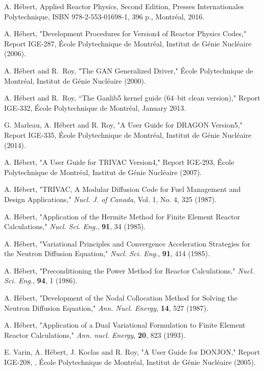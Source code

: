 \begin{thebibliography}{99}

A. H\'ebert, Applied Reactor Physics, Second Edition, Presses Internationales Polytechnique, ISBN 978-2-553-01698-1, 396 p., Montr\'eal, 2016.

A. H\'ebert, "Development Procedures for Version4 of
Reactor Physics Codes," Report IGE-287,
\'Ecole Polytechnique de Montr\'eal,
 Institut de G\'enie Nucl\'eaire (2006).

A. H\'ebert and R.~Roy, "The GAN Generalized Driver," 
\'Ecole Polytechnique de Montr\'eal,
 Institut de G\'enie Nucl\'eaire (2000).

A. H\'ebert and R.~Roy,
``The Ganlib5 kernel guide (64--bit clean version),"
Report IGE-332, \'Ecole Polytechnique de Montr\'eal, January 2013.

G. Marleau, A. H\'ebert and R. Roy,
"A User Guide for DRAGON Version5,"
Report IGE-335, \'Ecole Polytechnique de Montr\'eal,
Institut de G\'enie Nucl\'eaire (2014).

A. H\'ebert, "A User Guide for TRIVAC Version4,"
Report IGE-293, \'Ecole Polytechnique de Montr\'eal,
Institut de G\'enie Nucl\'eaire (2007).

A. H\'ebert, "TRIVAC, A Modular Diffusion Code for Fuel Management and 
Design Applications," {\sl Nucl. J. of Canada}, Vol. 1, No. 4, 325 (1987).

A. H\'ebert, "Application of the Hermite Method for Finite Element 
Reactor Calculations," {\sl Nucl. Sci. Eng.}, {\bf 91}, 34 (1985).

A. H\'ebert, "Variational Principles and Convergence Acceleration 
Strategies for the Neutron Diffusion Equation," {\sl Nucl. Sci. Eng.}, 
{\bf 91}, 414 (1985).

A. H\'ebert, "Preconditioning the Power Method for Reactor Calculations,"
{\sl Nucl. Sci. Eng.}, {\bf 94}, 1 (1986).

A. H\'ebert, "Development of the Nodal Collocation Method for Solving 
the Neutron Diffusion Equation," {\sl Ann. Nucl. Energy}, {\bf 14}, 
527 (1987).

A. H\'ebert, "Application of a Dual Variational Formulation to Finite 
Element Reactor Calculations," {\sl Ann. nucl. Energy}, {\bf 20}, 823 (1993).

E. Varin,  A. H\'ebert, J. Koclas and R. Roy, "A User Guide for DONJON,"
Report IGE-208, , \'Ecole Polytechnique de Montr\'eal,
Institut de G\'enie Nucl\'eaire (2005).


\end{thebibliography}
